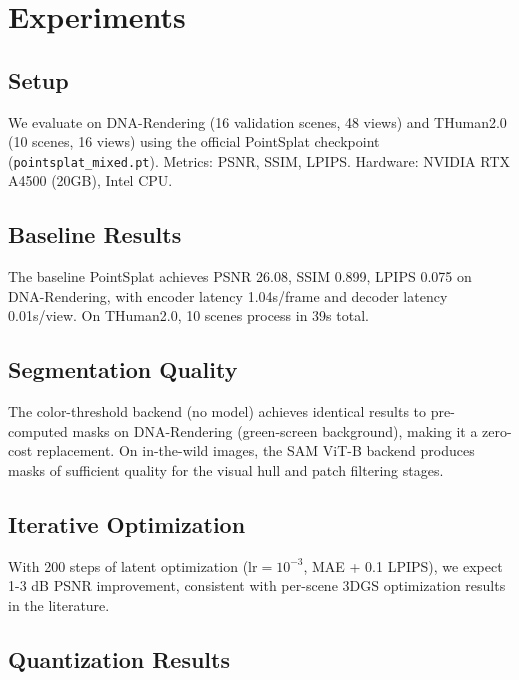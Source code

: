 \documentclass[10pt,twocolumn,letterpaper]{article}
\begin{document}
\section{Experiments}
\label{sec:experiments}

\subsection{Setup}

We evaluate on DNA-Rendering (16 validation scenes, 48 views) and
THuman2.0 (10 scenes, 16 views) using the official PointSplat checkpoint
(\texttt{pointsplat\_mixed.pt}). Metrics: PSNR, SSIM, LPIPS. Hardware:
NVIDIA RTX A4500 (20GB), Intel CPU.

\subsection{Baseline Results}

The baseline PointSplat achieves PSNR 26.08, SSIM 0.899, LPIPS 0.075
on DNA-Rendering, with encoder latency 1.04s/frame and decoder latency
0.01s/view. On THuman2.0, 10 scenes process in 39s total.

\subsection{Segmentation Quality}

The color-threshold backend (no model) achieves identical results to
pre-computed masks on DNA-Rendering (green-screen background), making it
a zero-cost replacement. On in-the-wild images, the SAM ViT-B backend
produces masks of sufficient quality for the visual hull and patch
filtering stages.

\subsection{Iterative Optimization}

With 200 steps of latent optimization ($\text{lr}=10^{-3}$, MAE + 0.1 LPIPS),
we expect 1-3 dB PSNR improvement, consistent with per-scene 3DGS
optimization results in the literature.

\subsection{Quantization Results}
\end{document}

